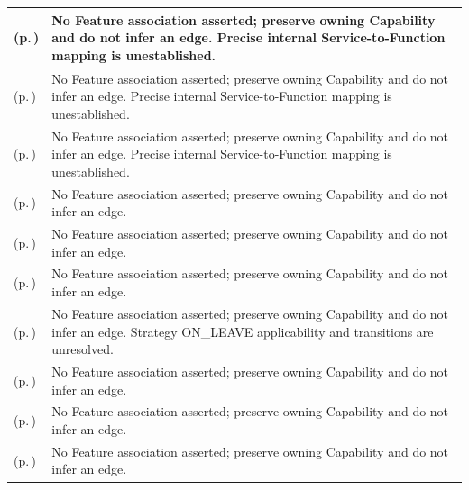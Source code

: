 \begin{longtable}{|>{\raggedright\arraybackslash}p{0.38\TableWidth}|>{\raggedright\arraybackslash}p{0.62\TableWidth}|}
\nameref{service:request-service-assurance} (p.\,\pageref{service:request-service-assurance}) & No Feature association asserted; preserve owning Capability and do not infer an edge. Precise internal Service-to-Function mapping is unestablished.\\\hline
\nameref{service:request-service-assurance-status} (p.\,\pageref{service:request-service-assurance-status}) & No Feature association asserted; preserve owning Capability and do not infer an edge. Precise internal Service-to-Function mapping is unestablished.\\\hline
\nameref{service:communicate-service-assurance-outcome} (p.\,\pageref{service:communicate-service-assurance-outcome}) & No Feature association asserted; preserve owning Capability and do not infer an edge. Precise internal Service-to-Function mapping is unestablished.\\\hline
\nameref{process:governed-person-identity-correction-process} (p.\,\pageref{process:governed-person-identity-correction-process}) & No Feature association asserted; preserve owning Capability and do not infer an edge.\\\hline
\nameref{process:practitioner-verification-process} (p.\,\pageref{process:practitioner-verification-process}) & No Feature association asserted; preserve owning Capability and do not infer an edge.\\\hline
\nameref{process:referral-progression-process} (p.\,\pageref{process:referral-progression-process}) & No Feature association asserted; preserve owning Capability and do not infer an edge.\\\hline
\nameref{process:encounter-lifecycle-process} (p.\,\pageref{process:encounter-lifecycle-process}) & No Feature association asserted; preserve owning Capability and do not infer an edge. Strategy ON\_LEAVE applicability and transitions are unresolved.\\\hline
\nameref{process:closed-loop-order-progression-process} (p.\,\pageref{process:closed-loop-order-progression-process}) & No Feature association asserted; preserve owning Capability and do not infer an edge.\\\hline
\nameref{process:clinical-document-lifecycle-process} (p.\,\pageref{process:clinical-document-lifecycle-process}) & No Feature association asserted; preserve owning Capability and do not infer an edge.\\\hline
\nameref{process:theatre-case-progression-process} (p.\,\pageref{process:theatre-case-progression-process}) & No Feature association asserted; preserve owning Capability and do not infer an edge.\\\hline

\end{longtable}

